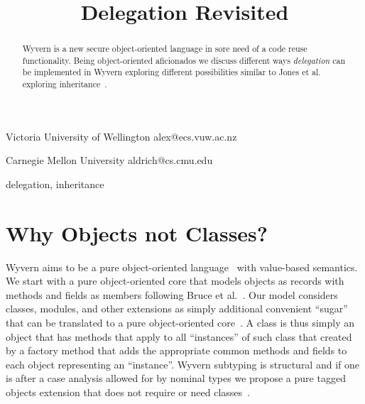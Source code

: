 \documentclass[preprint]{sigplanconf}
\begin{document}
\setlength{\pdfpageheight}{\paperheight}
\setlength{\pdfpagewidth}{\paperwidth}




\title{Delegation Revisited}

           {Victoria University of Wellington}
           {alex@ecs.vuw.ac.nz}

           {Carnegie Mellon University}
           {aldrich@cs.cmu.edu}
		   		   
\maketitle

\begin{abstract}
Wyvern is a new secure object-oriented language in sore need of a code reuse functionality. Being object-oriented aficionados we discuss different ways \textit{delegation} can be implemented in Wyvern exploring different possibilities similar to Jones et al. exploring inheritance~\cite{jones:2016:inheritance}.
\end{abstract}


%

\keywords
delegation, inheritance

\section{Why Objects not Classes?}

Wyvern aims to be a pure object-oriented language~\cite{Aldrich:2013:PIW:2509578.2514738} with value-based semantics. We start with a pure object-oriented core that models objects as records with methods and fields as members following Bruce et al.~\cite{BCP99}. Our model considers classes, modules, and other extensions as simply additional convenient ``sugar'' that can be translated to a pure object-oriented core~\cite{Nistor:2013:WST:2489828.2489830}. A class is thus simply an object that has methods that apply to all ``instances'' of such class that created by a factory method that adds the appropriate common methods and fields to each object representing an ``instance''. Wyvern subtyping is structural and if one is after a case analysis allowed for by nominal types we propose a pure tagged objects extension that does not require or need classes~\cite{DBLP:conf/ecoop/LeeASP15}.
\end{document}
